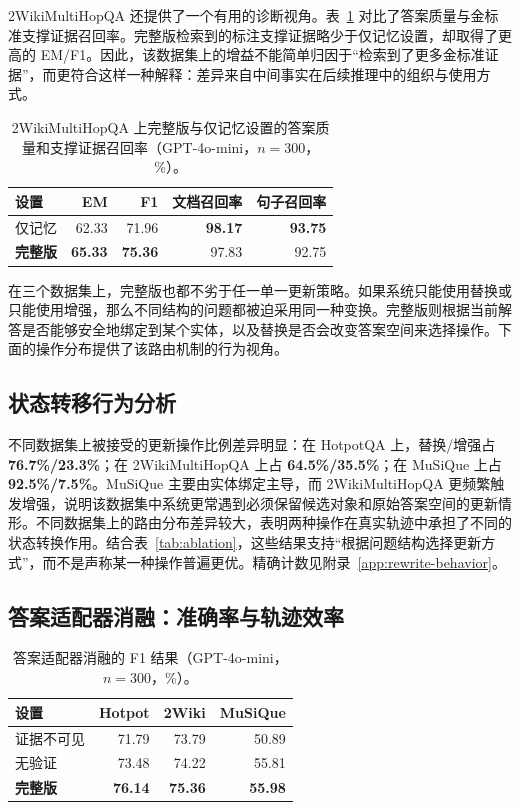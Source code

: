 \documentclass[11pt]{article}
\begin{document}
	2WikiMultiHopQA 还提供了一个有用的诊断视角。表~\ref{tab:2wiki-recall-diagnostic} 对比了答案质量与金标准支撑证据召回率。完整版检索到的标注支撑证据略少于仅记忆设置，却取得了更高的 EM/F1。因此，该数据集上的增益不能简单归因于“检索到了更多金标准证据”，而更符合这样一种解释：差异来自中间事实在后续推理中的组织与使用方式。

	\begin{table}[t]
		\centering
		\caption{2WikiMultiHopQA 上完整版与仅记忆设置的答案质量和支撑证据召回率（GPT-4o-mini，$n=300$，\%）。}
		\label{tab:2wiki-recall-diagnostic}
		\small
		\setlength{\tabcolsep}{3.6pt}
		\begin{tabular}{lrrrr}
			\toprule
			设置 & EM & F1 & 文档召回率 & 句子召回率\\
			\midrule
			仅记忆 & 62.33 & 71.96 & \textbf{98.17} & \textbf{93.75}\\
			\textbf{完整版} & \textbf{65.33} & \textbf{75.36} & 97.83 & 92.75\\
			\bottomrule
		\end{tabular}
	\end{table}

	在三个数据集上，完整版也都不劣于任一单一更新策略。如果系统只能使用替换或只能使用增强，那么不同结构的问题都被迫采用同一种变换。完整版则根据当前解答是否能够安全地绑定到某个实体，以及替换是否会改变答案空间来选择操作。下面的操作分布提供了该路由机制的行为视角。

	\subsection{状态转移行为分析}
	不同数据集上被接受的更新操作比例差异明显：在 HotpotQA 上，替换/增强占 \textbf{76.7\%/23.3\%}；在 2WikiMultiHopQA 上占 \textbf{64.5\%/35.5\%}；在 MuSiQue 上占 \textbf{92.5\%/7.5\%}。MuSiQue 主要由实体绑定主导，而 2WikiMultiHopQA 更频繁触发增强，说明该数据集中系统更常遇到必须保留候选对象和原始答案空间的更新情形。不同数据集上的路由分布差异较大，表明两种操作在真实轨迹中承担了不同的状态转换作用。结合表~\ref{tab:ablation}，这些结果支持“根据问题结构选择更新方式”，而不是声称某一种操作普遍更优。精确计数见附录~\ref{app:rewrite-behavior}。

	\subsection{答案适配器消融：准确率与轨迹效率}
	\begin{table}[t]
		\centering
		\caption{答案适配器消融的 F1 结果（GPT-4o-mini，$n=300$，\%）。}
		\label{tab:adapter-ablation}
		\small
		\setlength{\tabcolsep}{3.8pt}
		\begin{tabular}{lrrr}
			\toprule
			设置 & Hotpot & 2Wiki & MuSiQue\\
			\midrule
			证据不可见 & 71.79 & 73.79 & 50.89\\
			无验证 & 73.48 & 74.22 & 55.81\\
			\textbf{完整版} & \textbf{76.14} & \textbf{75.36} & \textbf{55.98}\\
			\bottomrule
		\end{tabular}
	\end{table}
\end{document}
